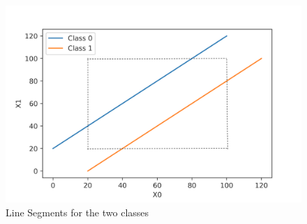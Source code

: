 \documentclass[twoside,11pt]{article}
\begin{document}
\begin{figure}
    \centering
    \includegraphics[scale=0.7]{Figures/simulation/example.png}
    \caption{Line Segments for the two classes}
    \label{line_segments}
\end{figure}
\end{document}
